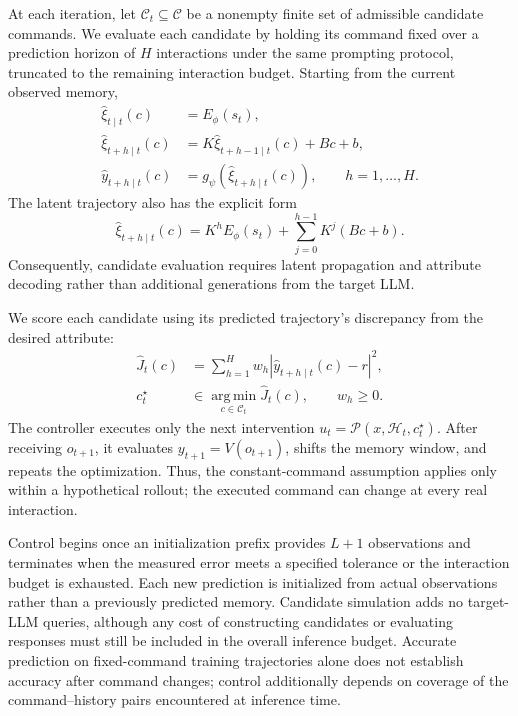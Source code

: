 At each iteration, let $\mathcal{C}_t\subseteq\mathcal{C}$ be a
nonempty finite set of admissible candidate commands. We evaluate each
candidate by holding its command fixed over a prediction horizon of
$H$ interactions under the same prompting protocol, truncated to the
remaining interaction budget. Starting from the current observed
memory,
\begin{equation}
    \begin{aligned}
        \widehat{\xi}_{t\mid t}(c)
        &= E_{\phi}(s_t),\\
        \widehat{\xi}_{t+h\mid t}(c)
        &=
        K\widehat{\xi}_{t+h-1\mid t}(c)+Bc+b,\\
        \widehat{y}_{t+h\mid t}(c)
        &=
        g_{\psi}\!\left(
            \widehat{\xi}_{t+h\mid t}(c)
        \right),
        \qquad h=1,\ldots,H.
    \end{aligned}
    \label{eq:rollout}
\end{equation}
The latent trajectory also has the explicit form
\begin{equation}
    \widehat{\xi}_{t+h\mid t}(c)
    =
    K^h E_{\phi}(s_t)
    +
    \sum_{j=0}^{h-1}K^j(Bc+b).
    \label{eq:closed_form_rollout}
\end{equation}
Consequently, candidate evaluation requires latent propagation and
attribute decoding rather than additional generations from the
target LLM.

We score each candidate using its predicted trajectory's discrepancy
from the desired attribute:
\begin{equation}
    \begin{aligned}
        \widehat{J}_t(c)
        &=
        \sum_{h=1}^{H}w_h
        \left|
            \widehat{y}_{t+h\mid t}(c)-r
        \right|^2,\\
        c_t^{\star}
        &\in
        \operatorname*{arg\,min}_{c\in\mathcal{C}_t}
        \widehat{J}_t(c),
        \qquad w_h\geq 0.
    \end{aligned}
    \label{eq:selection}
\end{equation}
The controller executes only the next intervention
$u_t=\mathcal{P}(x,\mathcal{H}_t,c_t^{\star})$. After receiving
$o_{t+1}$, it evaluates $y_{t+1}=V(o_{t+1})$, shifts the memory window,
and repeats the optimization. Thus, the constant-command assumption
applies only within a hypothetical rollout; the executed command can
change at every real interaction.

Control begins once an initialization prefix provides $L+1$
observations and terminates when the measured error meets a specified
tolerance or the interaction budget is exhausted. Each new prediction
is initialized from actual observations rather than a previously
predicted memory. Candidate simulation adds no target-LLM queries,
although any cost of constructing candidates or evaluating responses
must still be included in the overall inference budget. Accurate
prediction on fixed-command training trajectories alone does not
establish accuracy after command changes; control additionally depends
on coverage of the command--history pairs encountered at inference
time.

